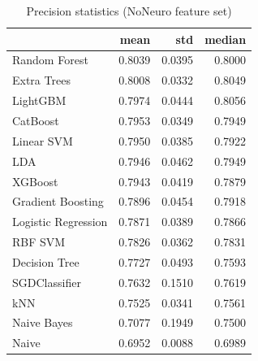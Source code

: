 \begin{table}
\caption{Precision statistics (NoNeuro feature set)}
\label{tab:precision_NoNeuro_stats}
\begin{tabular}{lrrr}
\toprule
 & mean & std & median \\
\midrule
Random Forest & 0.8039 & 0.0395 & 0.8000 \\
Extra Trees & 0.8008 & 0.0332 & 0.8049 \\
LightGBM & 0.7974 & 0.0444 & 0.8056 \\
CatBoost & 0.7953 & 0.0349 & 0.7949 \\
Linear SVM & 0.7950 & 0.0385 & 0.7922 \\
LDA & 0.7946 & 0.0462 & 0.7949 \\
XGBoost & 0.7943 & 0.0419 & 0.7879 \\
Gradient Boosting & 0.7896 & 0.0454 & 0.7918 \\
Logistic Regression & 0.7871 & 0.0389 & 0.7866 \\
RBF SVM & 0.7826 & 0.0362 & 0.7831 \\
Decision Tree & 0.7727 & 0.0493 & 0.7593 \\
SGDClassifier & 0.7632 & 0.1510 & 0.7619 \\
kNN & 0.7525 & 0.0341 & 0.7561 \\
Naive Bayes & 0.7077 & 0.1949 & 0.7500 \\
Naive & 0.6952 & 0.0088 & 0.6989 \\
\bottomrule
\end{tabular}
\end{table}
